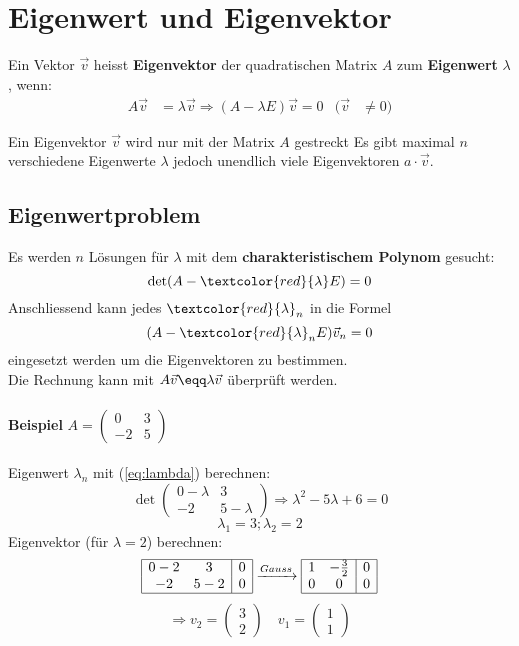 \section{Eigenwert und Eigenvektor}
Ein Vektor $\vec{v}$ heisst \textbf{Eigenvektor} der quadratischen Matrix $A$ zum \textbf{Eigenwert} $\lambda$, wenn: 
\begin{align*}
	A\vec{v} &= \lambda\vec{v} \Rightarrow (A - \lambda E)\vec{v} = 0  & (\vec{v} &\neq 0)
\end{align*}

\noindent
Ein Eigenvektor $\vec{v}$ wird nur mit der Matrix $A$ gestreckt Es gibt maximal $n$ verschiedene Eigenwerte $\lambda$ jedoch unendlich viele Eigenvektoren $a \cdot \vec{v}$.

\subsection{Eigenwertproblem}\label{charakteristischempolynom}
Es werden $n$ Lösungen für $\lambda$ mit dem \textbf{charakteristischem Polynom} gesucht:
\begin{equation}\label{eq:lambda}
	\det(A - \textcolor{red}{\lambda} E) = 0
\end{equation} Anschliessend kann jedes $\textcolor{red}{\lambda}_n$ in die Formel 
\begin{equation}
	(A - \textcolor{red}{\lambda}_n E)\vec{v}_n = 0
\end{equation} eingesetzt werden um die Eigenvektoren zu bestimmen. \\Die Rechnung kann mit $A\vec{v} \eqq \lambda\vec{v}$ überprüft werden.
\\ \\
\noindent\textbf{Beispiel}
$A = \begin{pmatrix} 0 & 3 \\ -2 & 5 \end{pmatrix}$
\\ \\
\noindent Eigenwert $\lambda_n$ mit (\ref{eq:lambda}) berechnen:
\[\det\begin{pmatrix}
	0 - \lambda & 3 \\
	-2 & 5 - \lambda
\end{pmatrix} \Rightarrow \lambda^2 - 5\lambda + 6 = 0\]
\[{\scriptstyle \lambda_1 = 3; \lambda_2 = 2}\]
\label{eigenvektor}
\noindent Eigenvektor (für $\lambda = 2$) berechnen:
\[
\begin{array}{|cc|c|}
	\hline
	0 - 2 & 3 & 0 \\
	-2 & 5 - 2 & 0 \\
	\hline
\end{array}
\xrightarrow{Gauss}
\begin{array}{|cc|c|}
	\hline
	1 & -\frac{3}{2} & 0 \\
	0 & 0 & 0 \\
	\hline
\end{array}
\]
\[\Rightarrow v_2 = \begin{pmatrix} 3 \\ 2 \end{pmatrix} \quad v_1 = \begin{pmatrix} 1 \\ 1 \end{pmatrix}\]

